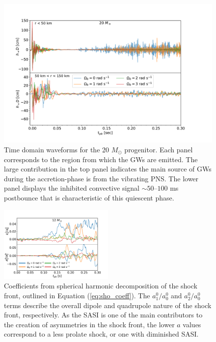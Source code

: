 \documentclass[twocolumn,times]{aastex62}  %
\begin{document}
 \begin{figure}[htp]
  \centering     %
  \includegraphics[width=\textwidth]{tdwf_region_20.pdf}
  \caption{Time domain waveforms for the 20 $M_\odot$ progenitor.  Each panel corresponds to the region from which the GWs are emitted.  The large contribution in the top panel indicates the main source of GWs during the accretion-phase is from the vibrating PNS.  The lower panel displays the inhibited convective signal $\sim 50$--$100 $ ms postbounce that is characteristic of this quiescent phase.}
  \label{fig:region}
\end{figure}

\begin{figure}
    \centering
    \includegraphics[width=0.5\textwidth]{sasi_axis_norm.pdf}
    \caption{Coefficients from spherical harmonic decomposition of the shock front, outlined in Equation (\ref{eq:sho_coeff}).  The $a_1^0/a_0^0$ and $a_2^0/a_0^0$ terms describe the overall dipole and quadrupole nature of the shock front, respectively.  As the SASI is one of the main contributors to the creation of asymmetries in the shock front, the lower $a$ values correspond to a less prolate shock, or one with diminished SASI.}
    \label{fig:sasi}
\end{figure}
\end{document}
